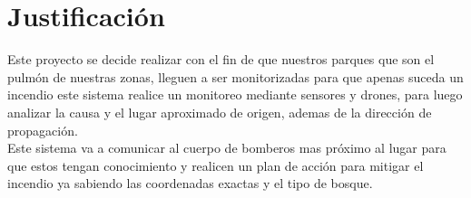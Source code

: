 \documentclass[letter,12pt]{article}
\begin{document}


\section{Justificaci\'on}
Este proyecto se decide realizar con el fin de que nuestros parques que son el pulmón de nuestras zonas, lleguen a ser monitorizadas para que apenas suceda un incendio este sistema realice un monitoreo mediante sensores y drones, para luego analizar la causa y el lugar aproximado de origen, ademas de la dirección de propagación.\\
Este sistema va a comunicar al cuerpo de bomberos mas próximo al lugar para que estos tengan conocimiento y realicen un plan de acción para mitigar el incendio ya sabiendo las coordenadas exactas y el tipo de bosque.
\end{document}
